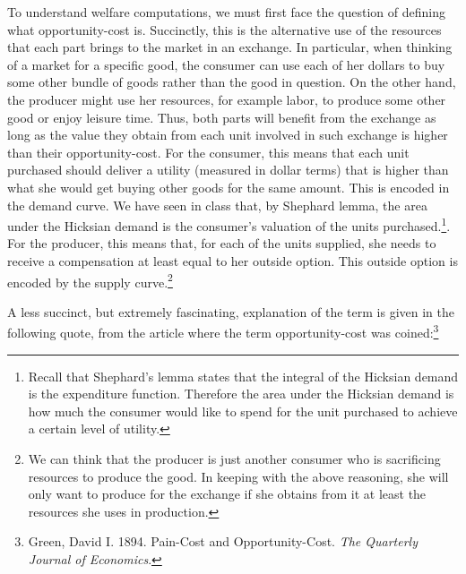 \documentclass[11pt,english]{article}
\begin{document}
To understand welfare computations, we must first face the question of defining what opportunity-cost is. Succinctly, this is the alternative use of the resources that each part brings to the market in an exchange. In particular, when thinking of a market for a specific good, the consumer can use each of her dollars to buy some other bundle of goods rather than the good in question. On the other hand, the producer might use her resources, for example labor, to produce some other good or enjoy leisure time. Thus, both parts will benefit from the exchange as long as the value they obtain from each unit involved in such exchange is higher than their opportunity-cost. For the consumer, this means that each unit purchased should deliver a utility (measured in dollar terms) that is higher than what she would get buying other goods for the same amount. This is encoded in the demand curve. We have seen in class that, by Shephard lemma, the area under the Hicksian demand is the consumer's valuation of the units purchased.\footnote{Recall that Shephard's lemma states that the integral of the Hicksian demand is the expenditure function. Therefore the area under the Hicksian demand is how much the consumer would like to spend for the unit purchased to achieve a certain level of utility.}. For the producer, this means that, for each of the units supplied, she needs to receive a compensation at least equal to her outside option. This outside option is encoded by the supply curve.\footnote{We can think that the producer is just another consumer who is sacrificing resources to produce the good. In keeping with the above reasoning, she will only want to produce for the exchange if she obtains from it at least the resources she uses in production.} 

A less succinct, but extremely fascinating, explanation of the term is given in the following quote, from the article where the term opportunity-cost was coined:\footnote{Green, David I. 1894. Pain-Cost and Opportunity-Cost. \textit{The Quarterly Journal of Economics}.  }
\end{document}
